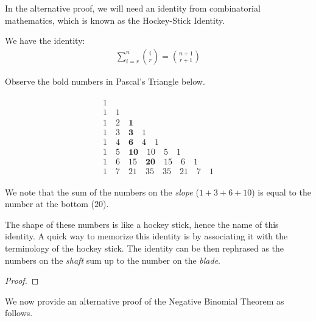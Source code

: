 \documentclass[thmcnt=section, 12pt]{elegantbook}
\begin{document}
\par In the alternative proof, we will need an identity from combinatorial mathematics, which is known as the Hockey-Stick Identity.

\begin{theorem}
    We have the identity:
    \begin{align*}
        \sum_{i=r}^n \binom{i}{r} = \binom{n+1}{r+1}
    \end{align*}
\end{theorem}

\par Observe the bold numbers in Pascal's Triangle below. 

\begin{align*}
    \begin{array}{c}
        1 \\ 
        1 \quad 1 \\ 
        1 \quad 2 \quad \mathbf{1}\\ 
        1 \quad 3 \quad \mathbf{3} \quad 1 \\ 
        1 \quad 4 \quad \mathbf{6} \quad 4 \quad 1 \\ 
        1 \quad 5 \quad \mathbf{10} \quad 10 \quad 5 \quad 1 \\ 
        1 \quad 6 \quad 15 \quad \mathbf{20} \quad 15 \quad 6 \quad 1 \\ 
        1 \quad 7 \quad 21 \quad 35 \quad 35 \quad 21 \quad 7 \quad 1
    \end{array}
\end{align*}

\par We note that the sum of the numbers on the \textit{slope} ($1+3+6+10$) is equal to the number at the bottom ($20$).

\par The shape of these numbers is like a hockey stick, hence the name of this identity. A quick way to memorize this identity is by associating it with the terminology of the hockey stick. The identity can be then rephrased as the numbers on the \textit{shaft} sum up to the number on the \textit{blade}.

\begin{proof}
\end{proof}


\par We now provide an alternative proof of the Negative Binomial Theorem as follows.
\end{document}
